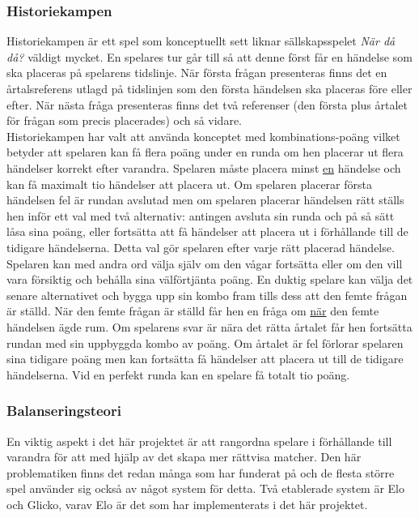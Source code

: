 \documentclass[a4paper, 11pt]{article}
\begin{document}
\subsubsection{Historiekampen}
Historiekampen är ett spel som konceptuellt sett liknar sällskapsspelet \textit{När då då?} väldigt mycket. En spelares tur går till så att denne först får en händelse som ska placeras på spelarens tidslinje. När första frågan presenteras finns det en årtalsreferens utlagd på tidslinjen som den första händelsen ska placeras före eller efter. När nästa fråga presenteras finns det två referenser (den första plus årtalet för frågan som precis placerades) och så vidare.\\ 
Historiekampen har valt att använda konceptet med kombinations-poäng vilket betyder att spelaren kan få flera poäng under en runda om hen placerar ut flera händelser korrekt efter varandra. Spelaren måste placera minst \underline{en} händelse och kan få maximalt tio händelser att placera ut. Om spelaren placerar första händelsen fel är rundan avslutad men om spelaren placerar händelsen rätt ställs hen inför ett val med två alternativ: antingen avsluta sin runda och på så sätt låsa sina poäng, eller fortsätta att få händelser att placera ut i förhållande till de tidigare händelserna. Detta val gör spelaren efter varje rätt placerad händelse. Spelaren kan med andra ord välja själv om den vågar fortsätta eller om den vill vara försiktig och behålla sina välförtjänta poäng. En duktig spelare kan välja det senare alternativet och bygga upp sin kombo fram tills dess att den femte frågan är ställd. När den femte frågan är ställd får hen en fråga om \underline{när} den femte händelsen ägde rum. Om spelarens svar är nära det rätta årtalet får hen fortsätta rundan med sin uppbyggda kombo av poäng. Om årtalet är fel förlorar spelaren sina tidigare poäng men kan fortsätta få händelser att placera ut till de tidigare händelserna. Vid en perfekt runda kan en spelare få totalt tio poäng.

\subsubsection{Balanseringsteori}
En viktig aspekt i det här projektet är att rangordna spelare i förhållande till varandra för att med hjälp av det skapa mer rättvisa matcher. Den här problematiken finns det redan många som har funderat på och de flesta större spel använder sig också av något system för detta. Två etablerade system är Elo och Glicko, varav Elo är det som har implementerats i det här projektet.
\end{document}
